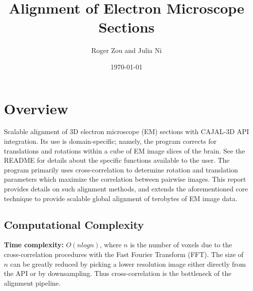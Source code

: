 \documentclass{article}
\author{Roger Zou and Julia Ni}
\date{\today}
\title{Alignment of Electron Microscope Sections}
\begin{document}
  
\maketitle

\section{Overview}
Scalable alignment of 3D electron microscope (EM) sections with CAJAL-3D API integration. Its use is domain-specific; namely, the program corrects for translations and rotations within a cube of EM image slices of the brain. See the README for details about the specific functions available to the user. The program primarily uses cross-correlation to determine rotation and translation parameters which maximize the correlation between pairwise images. This report provides details on such alignment methods, and extends the aforementioned core technique to provide scalable global alignment of terobytes of EM image data.

\subsection{Computational Complexity}
\textbf{Time complexity:} $O(nlogn)$, where $n$ is the number of voxels due to the cross-correlation procedures with the Fast Fourier Transform (FFT). The size of $n$ can be greatly reduced by picking a lower resolution image either directly from the API or by downsampling. Thus cross-correlation is the bottleneck of the alignment pipeline.
\end{document}
